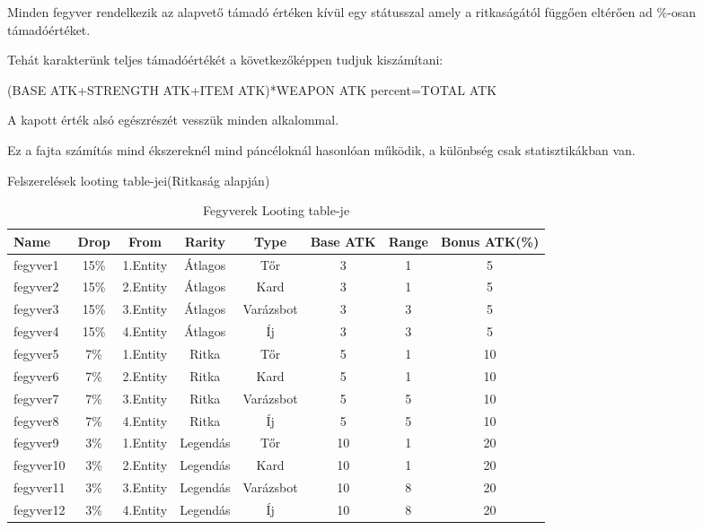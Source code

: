 Minden fegyver rendelkezik az alapvető támadó értéken kívül egy státusszal amely a ritkaságától függően eltérően ad \%-osan támadóértéket.

Tehát karakterünk teljes támadóértékét a következőképpen tudjuk kiszámítani:

(BASE ATK+STRENGTH ATK+ITEM ATK)*WEAPON ATK percent=TOTAL ATK

A kapott érték alsó egészrészét vesszük minden alkalommal.

Ez a fajta számítás mind ékszereknél mind páncéloknál hasonlóan működik, a különbség csak statisztikákban van.

Felszerelések looting table-jei(Ritkaság alapján)
\begin{table}[!ht]
\centering
\caption{Fegyverek Looting table-je}
\label{tab:table3}
\tabcolsep=0.11cm
\begin{tabular}{|l|c|c|c|c|c|c|c|}
\hline
 Name & Drop & From & Rarity & Type & Base ATK & Range & Bonus ATK(\%) \\
\hline
 fegyver1 & 15\% & 1.Entity & Átlagos & Tőr & 3 & 1 & 5 \\
\hline
 fegyver2 & 15\% & 2.Entity & Átlagos & Kard & 3 & 1 & 5 \\
\hline
 fegyver3 & 15\% & 3.Entity & Átlagos & Varázsbot & 3 & 3 & 5\\
\hline
 fegyver4 & 15\% & 4.Entity & Átlagos  & Íj & 3 & 3 & 5\\
\hline
 fegyver5 & 7\% & 1.Entity & Ritka & Tőr & 5 & 1 & 10 \\
\hline
 fegyver6 & 7\% & 2.Entity & Ritka & Kard & 5 & 1 & 10 \\
\hline
 fegyver7 & 7\% & 3.Entity & Ritka & Varázsbot & 5 & 5 & 10\\
\hline
 fegyver8 & 7\% & 4.Entity & Ritka  & Íj & 5 & 5 & 10\\
\hline
 fegyver9 & 3\% & 1.Entity & Legendás & Tőr & 10 & 1 & 20 \\
\hline
 fegyver10 & 3\% & 2.Entity & Legendás & Kard & 10 & 1 & 20 \\
\hline
 fegyver11 & 3\% & 3.Entity & Legendás & Varázsbot & 10 & 8 & 20\\
\hline
 fegyver12 & 3\% & 4.Entity & Legendás  & Íj & 10 & 8 & 20\\
\hline
\end{tabular}
\end{table}
\tabcolsep=0.11cm
